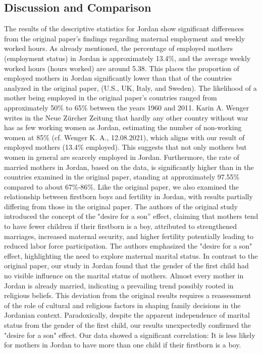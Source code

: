 \documentclass[12pt,draft,a4paper]{article}
\begin{document}
\subsection{Discussion and Comparison}
The results of the descriptive statistics for Jordan show significant differences from the original paper's findings regarding maternal employment and weekly worked hours. 
As already mentioned, the percentage of employed mothers (employment status) in Jordan is approximately 13.4\%, and the average weekly worked hours (hours worked) are around 5.38. 
This places the proportion of employed mothers in Jordan significantly lower than that of the countries analyzed in the original paper, (U.S., UK, Italy, and Sweden). 
The likelihood of a mother being employed in the original paper's countries ranged from approximately 50\% to 65\% between the years 1960 and 2011. 
Karin A. Wenger writes in the Neue Zürcher Zeitung that hardly any other country without war has as few working women as Jordan, estimating the number of non-working women at 85\% (cf. Wenger K. A., 12.08.2021), which aligns with our result of employed mothers (13.4\% employed).
This suggests that not only mothers but women in general are scarcely employed in Jordan. 
Furthermore, the rate of married mothers in Jordan, based on the data, is significantly higher than in the countries examined in the original paper, standing at approximately 97.55\% compared to about 67\%-86\%. 
Like the original paper, we also examined the relationship between firstborn boys and fertility in Jordan, with results partially differing from those in the original paper.
The authors of the original study introduced the concept of the "desire for a son” effect, claiming that mothers tend to have fewer children if their firstborn is a boy, attributed to strengthened marriages, increased maternal security, and higher fertility potentially leading to reduced labor force participation. 
The authors emphasized the "desire for a son" effect, highlighting the need to explore maternal marital status. 
In contrast to the original paper, our study in Jordan found that the gender of the first child had no visible influence on the marital status of mothers. 
Almost every mother in Jordan is already married, indicating a prevailing trend possibly rooted in religious beliefs. 
This deviation from the original results requires a reassessment of the role of cultural and religious factors in shaping family decisions in the Jordanian context. 
Paradoxically, despite the apparent independence of marital status from the gender of the first child, our results unexpectedly confirmed the "desire for a son" effect. 
Our data showed a significant correlation: It is less likely for mothers in Jordan to have more than one child if their firstborn is a boy. 
\end{document}
